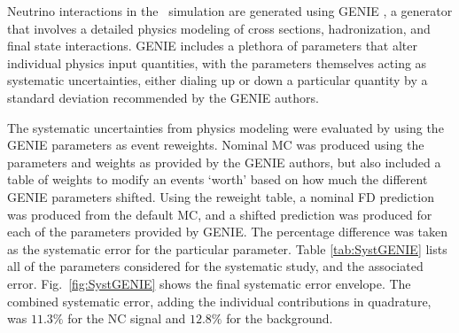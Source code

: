 Neutrino interactions in the \nova~simulation are generated using GENIE \cite{ref:GENIE}, a generator that involves a detailed physics modeling of cross sections, hadronization, and final state interactions. GENIE includes a plethora of parameters that alter individual physics input quantities, with the parameters themselves acting as systematic uncertainties, either dialing up or down a particular quantity by a standard deviation recommended by the GENIE authors.

The systematic uncertainties from physics modeling were evaluated by using the GENIE parameters as event reweights. Nominal MC was produced using the parameters and weights as provided by the GENIE authors, but also included a table of weights to modify an events `worth' based on how much the different GENIE parameters shifted. Using the reweight table, a nominal FD prediction was produced from the default MC, and a shifted prediction was produced for each of the parameters provided by GENIE. The percentage difference was taken as the systematic error for the particular parameter. Table \ref{tab:SystGENIE} lists all of the parameters considered for the systematic study, and the associated error. Fig.~\ref{fig:SystGENIE} shows the final systematic error envelope. The combined systematic error, adding the individual contributions in quadrature, was $11.3\%$ for the NC signal and $12.8\%$ for the background.

